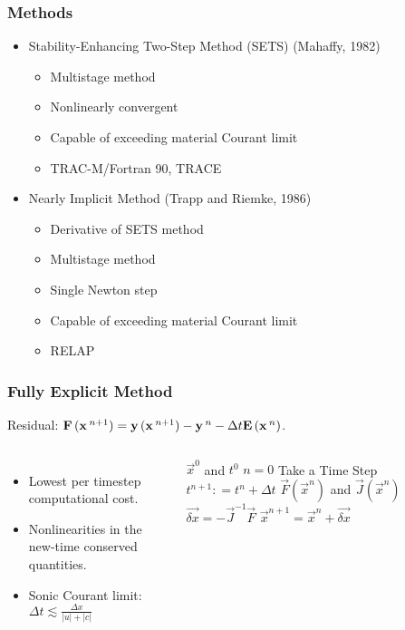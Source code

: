 \documentclass[compress,xcolor=table]{beamer}
\begin{document}
\begin{frame}
\frametitle{Methods}
\begin{itemize}
\item{Stability-Enhancing Two-Step Method (SETS) (Mahaffy, 1982)
\begin{itemize}
\item{Multistage method}
\item{Nonlinearly convergent}
\item{Capable of exceeding material Courant limit}
\item{TRAC-M/Fortran 90, TRACE}
\end{itemize}
}
\item{Nearly Implicit Method (Trapp and Riemke, 1986)
\begin{itemize}
\item{Derivative of SETS method}
\item{Multistage method}
\item{Single Newton step}
\item{Capable of exceeding material Courant limit}
\item{RELAP}
\end{itemize}
}
\end{itemize}

\end{frame}
\begin{frame}
\frametitle{Fully Explicit Method}
Residual: $\vec{F}(\vec{x}^{n+1}) = \vec{y}(\vec{x}^{n+1}) - \vec{y}^{n} - \dt{} \vec{E}(\vec{x}^{n})$.
\begin{columns}
\begin{itemize}
\item{Lowest per timestep computational cost.}
\item{Nonlinearities in the new-time conserved quantities.}
\item{Sonic Courant limit: $ \Delta t \lesssim \frac{\Delta x}{|u|+|c|}$}
\end{itemize}

\begin{algorithmic}
\scriptsize
\Require $\vec{x}^{0}$ and $t^{0}$
\Set $n = 0$
\Loop \; Take a Time Step
    \Set $t^{n+1} : = t^{n} + \Delta t$
    \Calculate $\vec{F}(\vec{x}^n)$ and $\vec{J}(\vec{x}^n)$
    \Calculate $\vec{\delta x} = -\vec{J}^{-1}\vec{F}$
    \Calculate $\vec{x}^{n+1} = \vec{x}^{n} + \vec{\delta x}$ 
\end{algorithmic}

\end{columns}

\end{frame}
\end{document}
